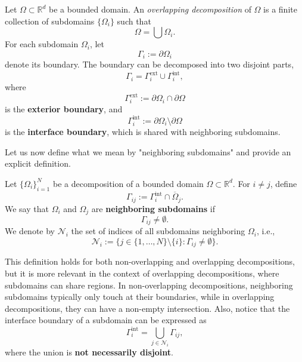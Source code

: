 \begin{definition}
Let $\Omega \subset \mathbb{R}^d$ be a bounded domain. An \textit{overlapping decomposition} of $\Omega$ is a finite collection of subdomains $\{\Omega_{i}\}$ such that
\begin{equation*}
    \Omega = \bigcup\Omega_{i}.
\end{equation*}
For each subdomain $\Omega_i$, let
\begin{equation*}
    \Gamma_{i} := \partial \Omega_i
\end{equation*}
denote its boundary. The boundary can be decomposed into two disjoint parts, 
\begin{equation*}
    \Gamma_{i} = \Gamma_{i}^{\text{ext}} \cup \Gamma_{i}^{\text{int}},
\end{equation*}
where
\begin{equation*}
    \Gamma_{i}^{\text{ext}} := \partial \Omega_i \cap \partial \Omega
\end{equation*}
is the \textbf{exterior boundary}, and
\begin{equation*}
    \Gamma_{i}^{\text{int}} := \partial \Omega_{i} \setminus \partial\Omega
\end{equation*}
is the \textbf{interface boundary}, which is shared with neighboring subdomains.
\end{definition}
\noindent Let us now define what we mean by "neighboring subdomains" and provide an explicit definition.
\begin{definition}
Let $\{\Omega_i\}_{i=1}^N$ be a decomposition of a bounded domain $\Omega \subset \mathbb{R}^d$. For $i \neq j$, define 
\begin{equation*}
    \Gamma_{ij} := \Gamma_i^{\text{int}} \cap \overline{\Omega}_j.
\end{equation*}
We say that $\Omega_i$ and $\Omega_j$ are \textbf{neighboring subdomains} if
\begin{equation*}
    \Gamma_{ij} \neq \emptyset.
\end{equation*}
We denote by $\mathcal{N}_i$ the set of indices of all subdomains neighboring $\Omega_{i}$, i.e.,
\begin{equation*}
    \mathcal{N}_i := \{ j \in \{1, \dots, N\} \setminus \{i\} : \Gamma_{ij} \neq \emptyset \}.
\end{equation*}
\end{definition}
This definition holds for both non-overlapping and overlapping decompositions, but it is more relevant in the context of overlapping decompositions, 
where subdomains can share regions. In non-overlapping decompositions, neighboring subdomains typically only touch at their boundaries, while in 
overlapping decompositions, they can have a non-empty intersection. Also, notice that the interface boundary of a subdomain can be expressed as
\begin{equation*}
    \Gamma_{i}^{\text{int}} = \bigcup_{j \in \mathcal{N}_i} \Gamma_{ij},
\end{equation*}
where the union is \textbf{not necessarily disjoint}. 

